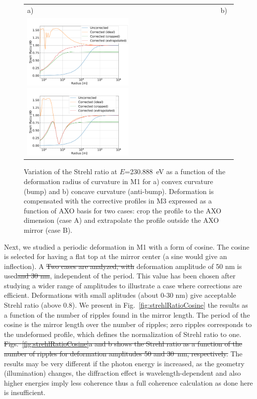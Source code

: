 \documentclass{iucr}
\newcommand{\replace}[2]{{\color{blue}#1}{\color{blue}\sout{#2}}}
\begin{document}
  \begin{figure}
  \label{fig:strehlRatioVersusR} 
  \begin{center}
  \begin{tabular}{l} 
  a)~~~~~~~~~~~~~~~~~~~~~~~~~~~~~~~~~~~~~~~~~~~~~~~~~~~~~~b) \\
  \includegraphics[width=0.5\textwidth]{figures/scan_peak_vs_negative_radius.pdf}
    \includegraphics[width=0.5\textwidth]{figures/scan_peak_vs_positive_radius.pdf} 
  
  \end{tabular}
  \end{center}
  \caption{
Variation of the Strehl ratio at $E$=230.888~eV as a function of the deformation radius of curvature in M1 for a) convex curvature (bump) and b) concave curvature (anti-bump). Deformation is compensated with the corrective profiles in M3 expressed as a function of AXO basis for two cases: crop the profile to the AXO dimension (case A) and extrapolate the profile outside the AXO mirror (case B).}
  \end{figure} 


Next, we studied a periodic deformation in M1 with a form of cosine. The cosine is selected for having a flat top at the mirror center (a sine would give an inflection). \replace{A }{Two cases are analyzed, with} deformation amplitude of 50 nm \replace{is used}{and 30 nm}, independent of the period. This value has been chosen after studying a wider range of amplitudes to illustrate a case where corrections are efficient. \replace{Deformations with small aplitudes (about 0-30 nm) give acceptable Strehl ratio (above 0.8).}{} We present in Fig.~\ref{fig:strehlRatioCosine} the results as a function of the number of ripples found in the mirror length. The period of the cosine is the mirror length over the number of ripples; zero ripples corresponds to the undeformed profile, which defines the normalization of Strehl ratio to one. \replace{}{Figs.~\ref{fig:strehlRatioCosine}a and b shows the Strehl ratio as a function of the number of ripples for deformation amplitudes 50 and 30~nm, respectively.} The results may be very different if the photon energy is increased, as the geometry (illumination) changes, the diffraction effect is wavelength-dependent and also higher energies imply less coherence thus a  full coherence calculation as done here is insufficient.
\end{document}
